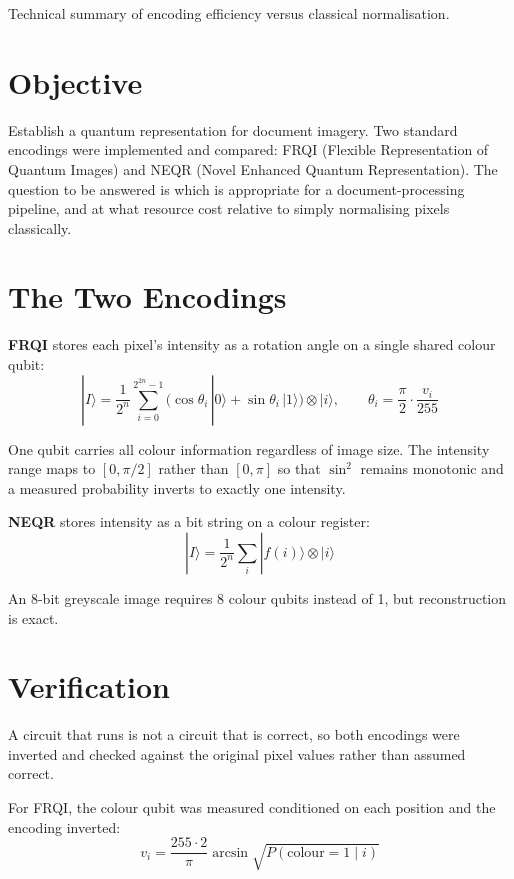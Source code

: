 \documentclass[11pt,a4paper]{article}
\begin{document}
{Technical summary of encoding efficiency versus classical normalisation.}

\section{Objective}

Establish a quantum representation for document imagery. Two standard encodings
were implemented and compared: FRQI (Flexible Representation of Quantum Images)
and NEQR (Novel Enhanced Quantum Representation). The question to be answered is
which is appropriate for a document-processing pipeline, and at what resource
cost relative to simply normalising pixels classically.

\section{The Two Encodings}

\textbf{FRQI} stores each pixel's intensity as a rotation angle on a single
shared colour qubit:
\begin{equation}
|I\rangle = \frac{1}{2^{n}}\sum_{i=0}^{2^{2n}-1}
\big(\cos\theta_i\,|0\rangle + \sin\theta_i\,|1\rangle\big)\otimes|i\rangle,
\qquad \theta_i = \frac{\pi}{2}\cdot\frac{v_i}{255}
\end{equation}

One qubit carries all colour information regardless of image size. The intensity
range maps to $[0, \pi/2]$ rather than $[0,\pi]$ so that $\sin^2$ remains
monotonic and a measured probability inverts to exactly one intensity.

\textbf{NEQR} stores intensity as a bit string on a colour register:
\begin{equation}
|I\rangle = \frac{1}{2^{n}}\sum_{i}|f(i)\rangle\otimes|i\rangle
\end{equation}

An 8-bit greyscale image requires 8 colour qubits instead of 1, but
reconstruction is exact.

\section{Verification}

A circuit that runs is not a circuit that is correct, so both encodings were
inverted and checked against the original pixel values rather than assumed
correct.

For FRQI, the colour qubit was measured conditioned on each position and the
encoding inverted:
\begin{equation}
v_i = \frac{255 \cdot 2}{\pi}\arcsin\sqrt{P(\text{colour}=1 \mid i)}
\end{equation}
\end{document}
